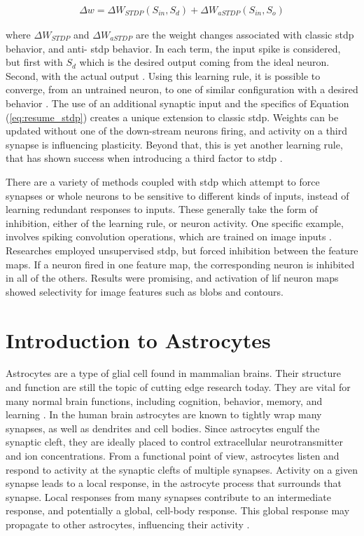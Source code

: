 \documentclass[conference]{IEEEtran}
\newcommand{\eq}[1]{Equation (\ref{#1})}
\begin{document}
\begin{align}
  \Delta w = \Delta W_{STDP}(S_{in}, S_{d}) + \Delta W_{aSTDP}(S_{in}, S_{o}) \label{eq:resume_stdp}
\end{align}

\noindent where $\Delta W_{STDP}$ and $\Delta W_{aSTDP}$ are the weight changes
associated with classic \gls{stdp} behavior, and anti- \gls{stdp} behavior. In
each term, the input spike is considered, but first with $S_{d}$ which is the
desired output coming from the ideal neuron. Second, with the actual output
\parencite{mozafari_2018}. Using this learning rule, it is possible to converge,
from an untrained neuron, to one of similar configuration with a desired
behavior \parencite{ponulak_2010}. The use of an additional synaptic input and
the specifics of \eq{eq:resume_stdp} creates a unique extension to classic
\gls{stdp}. Weights can be updated without one of the down-stream neurons
firing, and activity on a third synapse is influencing plasticity. Beyond that,
this is yet another learning rule, that has shown success when introducing a
third factor to \gls{stdp} \parencite{mozafari_2018}.

There are a variety of methods coupled with \gls{stdp} which attempt to force
synapses or whole neurons to be sensitive to different kinds of inputs, instead
of learning redundant responses to inputs. These generally take the form of
inhibition, either of the learning rule, or neuron activity. One specific
example, involves spiking convolution operations, which are trained on image
inputs \parencite{delorme_2001}. Researches employed unsupervised \gls{stdp},
but forced inhibition between the feature maps. If a neuron fired in one feature
map, the corresponding neuron is inhibited in all of the others. Results were
promising, and activation of \gls{lif} neuron maps showed selectivity for image
features such as blobs and contours.

\section{Introduction to Astrocytes}
Astrocytes are a type of glial cell found in mammalian brains. Their
structure and function are still the topic of cutting edge research
today. They are vital for many normal brain functions, including
cognition, behavior, memory, and learning \parencite{mederos_2018}. In the human
brain astrocytes are known to tightly wrap many synapses, as well as dendrites and cell
bodies. Since astrocytes engulf the synaptic cleft, they are ideally
placed to control extracellular neurotransmitter and ion
concentrations. From a functional point of view, astrocytes listen and
respond to activity at the synaptic clefts of multiple synapses. Activity on
a given synapse leads to a local response, in the astrocyte process that
surrounds that synapse. Local responses from many synapses contribute to an
intermediate response, and potentially a global, cell-body response. This global
response may propagate to other astrocytes, influencing their activity
\parencite{min_2012}.
\end{document}
